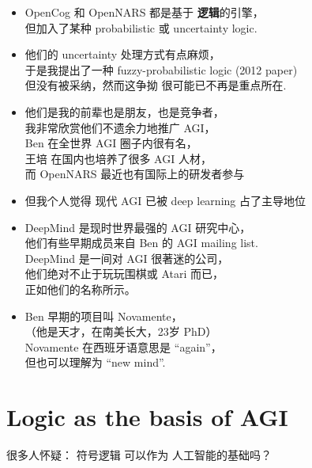 \begin{itemize}
	\item OpenCog 和 OpenNARS 都是基于 \textbf{逻辑}的引擎，\\
		但加入了某种 probabilistic 或 uncertainty logic.
	\item 他们的 uncertainty 处理方式有点麻烦，\\
		于是我提出了一种 fuzzy-probabilistic logic (2012 paper) \\
		但没有被采纳，然而这争拗 很可能已不再是重点所在.
	\item 他们是我的前辈也是朋友，也是竞争者，\\
		我非常欣赏他们不遗余力地推广 AGI，\\
		Ben 在全世界 AGI 圈子内很有名，\\
		王培 在国内也培养了很多 AGI 人材，\\
		而 OpenNARS 最近也有国际上的研发者参与
	\item 但我个人觉得 现代 AGI 已被 deep learning 占了主导地位
	\item DeepMind 是现时世界最强的 AGI 研究中心，\\
		他们有些早期成员来自 Ben 的 AGI mailing list.\\
		DeepMind 是一间对 AGI 很著迷的公司，\\
		他们绝对不止于玩玩围棋或 Atari 而已，\\
		正如他们的名称所示。
	\item Ben 早期的项目叫 Novamente，\\
		（他是天才，在南美长大，23岁 PhD） \\
		Novamente 在西班牙语意思是 ``again''，\\
		但也可以理解为 ``new mind''.
\end{itemize}

\section*{Logic as the basis of AGI}

很多人怀疑： 符号逻辑 可以作为 人工智能的基础吗？ 

